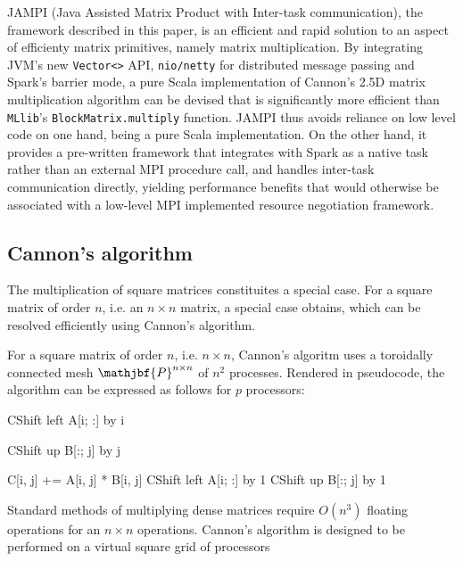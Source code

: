 \documentclass[fleqn,10pt]{SelfArx} %
\begin{document}
JAMPI (Java Assisted Matrix Product with Inter-task communication), the framework described in this paper, is an efficient and rapid solution to an aspect of efficienty matrix primitives, namely matrix multiplication. By integrating JVM's new \texttt{Vector<>} API, \texttt{nio/netty} for distributed message passing and Spark's barrier mode, a pure Scala implementation of Cannon's 2.5D matrix multiplication algorithm can be devised that is significantly more efficient than \texttt{MLlib}'s \texttt{BlockMatrix.multiply} function. JAMPI thus avoids reliance on low level code on one hand, being a pure Scala implementation. On the other hand, it provides a pre-written framework that integrates with Spark as a native task rather than an external MPI procedure call, and handles inter-task communication directly, yielding performance benefits that would otherwise be associated with a low-level MPI implemented resource negotiation framework.

\subsection{Cannon's algorithm} %
\label{sub:cannon_s_algorithm}

The multiplication of square matrices constituites a special case. For a square matrix of order $n$, i.e. an $n \times n$ matrix, a special case obtains, which can be resolved efficiently using Cannon's algorithm.\cite{cannon1969cellular} 

For a square matrix of order $n$, i.e. $n \times n$, Cannon's algoritm uses a toroidally connected mesh $\mathjbf{P}^{n \times n}$ of $n^2$ processes. Rendered in pseudocode, the algorithm can be expressed as follows for $p$ processors:

\begin{algorithmic}
		\State CShift left A[i; :] by i 
	\EndFor
	
		\State CShift up B[:; j] by j 
	\EndFor
	
			\State C[i, j] += A[i, j] * B[i, j]
			\State CShift left A[i; :] by 1
			\State CShift up B[:; j] by 1
		\EndFor
	\EndFor
\end{algorithmic}

Standard methods of multiplying dense matrices require $O(n^3)$ floating operations for an $n \times n$ operations. Cannon's algorithm is designed to be performed on a virtual square grid of processors 
\end{document}

